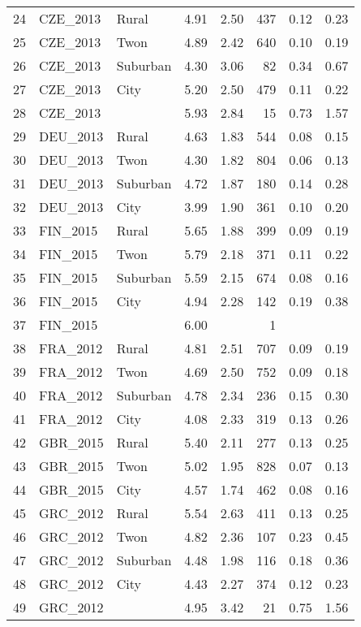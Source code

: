 \begin{table}[ht]
\begin{tabular}{rllrrrrr}
  24 & CZE\_2013 & Rural & 4.91 & 2.50 & 437 & 0.12 & 0.23 \\ 
  25 & CZE\_2013 & Twon & 4.89 & 2.42 & 640 & 0.10 & 0.19 \\ 
  26 & CZE\_2013 & Suburban & 4.30 & 3.06 &  82 & 0.34 & 0.67 \\ 
  27 & CZE\_2013 & City & 5.20 & 2.50 & 479 & 0.11 & 0.22 \\ 
  28 & CZE\_2013 &  & 5.93 & 2.84 &  15 & 0.73 & 1.57 \\ 
  29 & DEU\_2013 & Rural & 4.63 & 1.83 & 544 & 0.08 & 0.15 \\ 
  30 & DEU\_2013 & Twon & 4.30 & 1.82 & 804 & 0.06 & 0.13 \\ 
  31 & DEU\_2013 & Suburban & 4.72 & 1.87 & 180 & 0.14 & 0.28 \\ 
  32 & DEU\_2013 & City & 3.99 & 1.90 & 361 & 0.10 & 0.20 \\ 
  33 & FIN\_2015 & Rural & 5.65 & 1.88 & 399 & 0.09 & 0.19 \\ 
  34 & FIN\_2015 & Twon & 5.79 & 2.18 & 371 & 0.11 & 0.22 \\ 
  35 & FIN\_2015 & Suburban & 5.59 & 2.15 & 674 & 0.08 & 0.16 \\ 
  36 & FIN\_2015 & City & 4.94 & 2.28 & 142 & 0.19 & 0.38 \\ 
  37 & FIN\_2015 &  & 6.00 &  &   1 &  &  \\ 
  38 & FRA\_2012 & Rural & 4.81 & 2.51 & 707 & 0.09 & 0.19 \\ 
  39 & FRA\_2012 & Twon & 4.69 & 2.50 & 752 & 0.09 & 0.18 \\ 
  40 & FRA\_2012 & Suburban & 4.78 & 2.34 & 236 & 0.15 & 0.30 \\ 
  41 & FRA\_2012 & City & 4.08 & 2.33 & 319 & 0.13 & 0.26 \\ 
  42 & GBR\_2015 & Rural & 5.40 & 2.11 & 277 & 0.13 & 0.25 \\ 
  43 & GBR\_2015 & Twon & 5.02 & 1.95 & 828 & 0.07 & 0.13 \\ 
  44 & GBR\_2015 & City & 4.57 & 1.74 & 462 & 0.08 & 0.16 \\ 
  45 & GRC\_2012 & Rural & 5.54 & 2.63 & 411 & 0.13 & 0.25 \\ 
  46 & GRC\_2012 & Twon & 4.82 & 2.36 & 107 & 0.23 & 0.45 \\ 
  47 & GRC\_2012 & Suburban & 4.48 & 1.98 & 116 & 0.18 & 0.36 \\ 
  48 & GRC\_2012 & City & 4.43 & 2.27 & 374 & 0.12 & 0.23 \\ 
  49 & GRC\_2012 &  & 4.95 & 3.42 &  21 & 0.75 & 1.56 \\ 

\end{tabular}
\end{table}

